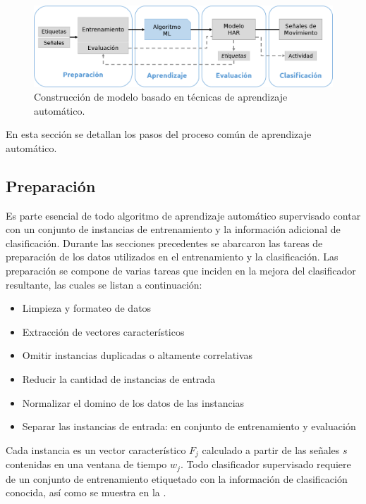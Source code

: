 \begin{figure}[H]
\begin{centering}
\includegraphics[width=1\columnwidth]{capitulo-4/graphics/clasificacion}
\par\end{centering}
\caption[Modelo de aprendizaje automático]{\label{fig4:clasificador}Construcción de modelo  basado
en técnicas de aprendizaje automático.}
\end{figure}

En esta sección se detallan los pasos del proceso común de aprendizaje
automático.

\subsection{Preparación}

Es parte esencial de todo algoritmo de aprendizaje automático supervisado
contar con un conjunto de instancias de entrenamiento y la información
adicional de clasificación. Durante las secciones precedentes se abarcaron
las tareas de preparación de los datos utilizados en el entrenamiento
y la clasificación. Las preparación se compone de varias tareas que
inciden en la mejora del clasificador resultante, las cuales se listan
a continuación:
\begin{itemize}
\item Limpieza y formateo de datos
\item Extracción de vectores característicos
\item Omitir instancias duplicadas o altamente correlativas
\item Reducir la cantidad de instancias de entrada
\item Normalizar el domino de los datos de las instancias
\item Separar las instancias de entrada: en conjunto de entrenamiento y
evaluación
\end{itemize}
Cada instancia es un vector característico $F_{j}$ calculado a partir
de las señales $s$ contenidas en una ventana de tiempo $w_{j}$.
Todo clasificador supervisado requiere de un conjunto de entrenamiento
etiquetado con la información de clasificación conocida, así como
se muestra en la . 

